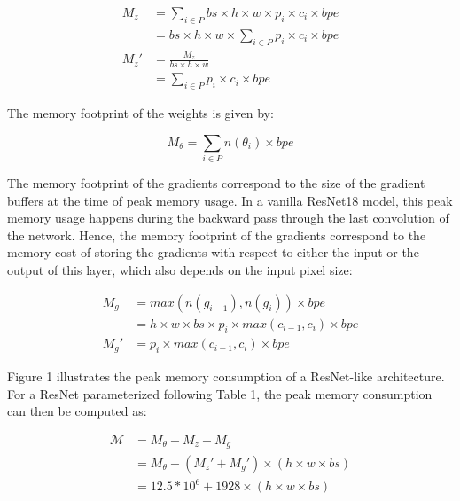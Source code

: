\documentclass[twocolumn]{bmcart}
\begin{document}
\begin{subequations}
\begin{align}
M_{z} &= \sum_{i \in P} bs \times h \times w \times p_i \times c_i \times bpe \\
      &= bs \times h \times w \times \sum_{i \in P} p_i \times c_i \times bpe \\
M_{z}' &= \frac{M_{z}}{bs \times h \times w}  \\
       &= \sum_{i \in P} p_i \times c_i \times bpe 
\end{align}
\end{subequations}

The memory footprint of the weights is given by:

\begin{equation}
 M_{\theta} = \sum_{i \in P}  n(\theta_i)\times bpe 
\end{equation}

The memory footprint of the gradients correspond to the size of the gradient buffers at the time of peak memory usage. In a vanilla ResNet18 model, this peak memory usage happens during the backward pass through the last convolution of the network.
Hence, the memory footprint of the gradients correspond to the memory cost of storing the gradients with respect to either the input or the output of this layer, which also depends on the input pixel size:

\begin{subequations}
\begin{align}
M_{g}  &= max(n(g_{i-1}), n(g_i)) \times bpe \\
       &= h \times w \times bs \times p_i \times max(c_{i-1}, c_i) \times bpe\\
M_{g}' &= p_i \times max(c_{i-1}, c_i) \times bpe
\end{align}
\end{subequations}

Figure 1 illustrates the peak memory consumption of a ResNet-like architecture.
For a ResNet parameterized following Table 1, the peak memory consumption can then be computed as:

\begin{subequations}
\begin{align}
\mathcal{M} &= M_{\theta} + M_{z} + M_{g} \\
            &= M_{\theta} + (M_{z}' + M_{g}') \times (h \times w \times bs) \\
            &= 12.5*10^6 + 1928 \times (h \times w \times bs) \\ 
\end{align}
\end{subequations}
\end{document}
